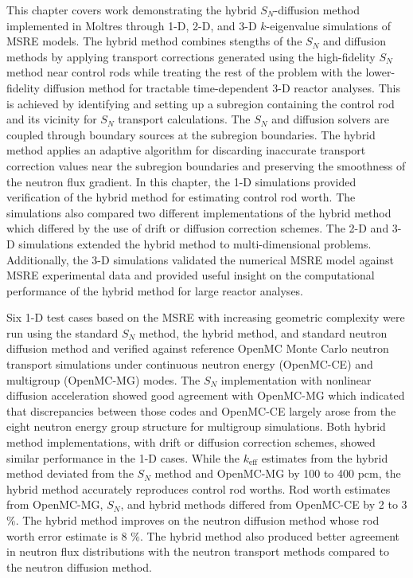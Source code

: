 This chapter covers work demonstrating the hybrid $S_N$-diffusion method implemented in Moltres
through 1-D, 2-D, and 3-D $k$-eigenvalue simulations of \gls{MSRE} models. The hybrid method
combines stengths of the $S_N$
and diffusion methods by applying transport corrections generated using the high-fidelity $S_N$
method near control rods while treating the rest of the problem with the lower-fidelity diffusion
method for tractable time-dependent 3-D reactor analyses. This is achieved by identifying and
setting up a subregion containing the control rod and its vicinity for $S_N$ transport
calculations. The $S_N$ and diffusion solvers are coupled through boundary sources at the subregion
boundaries. The hybrid method applies an adaptive algorithm for discarding inaccurate transport
correction values near the subregion boundaries and preserving the smoothness of the neutron flux
gradient. In this chapter, the 1-D simulations provided verification of the hybrid method for
estimating control rod worth. The simulations also compared two different implementations of the
hybrid method which differed by the use of drift or diffusion correction schemes.
The 2-D and 3-D simulations extended the hybrid method to multi-dimensional problems. Additionally,
the 3-D simulations validated the numerical \gls{MSRE} model against \gls{MSRE} experimental data
and provided useful insight on the computational performance of the hybrid method for
large reactor analyses.

Six 1-D test cases based on the \gls{MSRE} with increasing geometric complexity were run using the
standard $S_N$ method, the hybrid method, and standard neutron diffusion method and verified against
reference OpenMC Monte Carlo neutron transport simulations under continuous neutron energy (OpenMC-CE) and
multigroup (OpenMC-MG) modes. The $S_N$ implementation with nonlinear diffusion acceleration
showed good agreement with OpenMC-MG which indicated that discrepancies between those codes and
OpenMC-CE largely arose from the eight neutron energy group structure for multigroup simulations.
Both hybrid method implementations, with drift or diffusion correction schemes, showed similar
performance in the 1-D cases. While the $k_\text{eff}$ estimates from the hybrid method deviated
from the $S_N$ method and OpenMC-MG by 100 to 400 pcm, the hybrid method accurately reproduces
control rod worths. Rod worth estimates from OpenMC-MG, $S_N$, and hybrid methods differed from
OpenMC-CE by 2 to 3 \%. The hybrid method improves on the neutron diffusion method whose rod worth
error estimate is 8 \%. The hybrid method also produced better agreement in neutron flux
distributions with the neutron transport methods compared to the neutron diffusion method.

